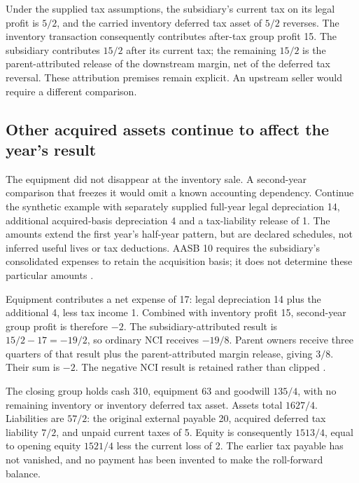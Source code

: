 Under the supplied tax assumptions, the subsidiary's current tax on its legal
profit is $5/2$, and the carried inventory deferred tax asset of $5/2$ reverses.
The inventory transaction consequently contributes after-tax group profit 15.
The subsidiary contributes $15/2$ after its current tax; the remaining $15/2$
is the parent-attributed release of the downstream margin, net of the deferred
tax reversal. These attribution premises remain explicit. An upstream seller
would require a different comparison.

\subsection{Other acquired assets continue to affect the year's result}

The equipment did not disappear at the inventory sale. A second-year comparison
that freezes it would omit a known accounting dependency. Continue the
synthetic example with separately supplied full-year legal depreciation 14,
additional acquired-basis depreciation 4 and a tax-liability release of 1.
The amounts extend the first year's half-year pattern, but are declared
schedules, not inferred useful lives or tax deductions. AASB 10 requires the
subsidiary's consolidated expenses to retain the acquisition basis; it does
not determine these particular amounts
\citep[para.~B88]{aasb10control2026}.

Equipment contributes a net expense of 17: legal depreciation 14 plus the
additional 4, less tax income 1. Combined with inventory profit 15, second-year
group profit is therefore $-2$. The subsidiary-attributed result is
$15/2-17=-19/2$, so ordinary NCI receives $-19/8$. Parent owners receive
three quarters of that result plus the parent-attributed margin release,
giving $3/8$. Their sum is $-2$. The negative NCI result is retained rather
than clipped \citep[para.~B94]{aasb10control2026}.

The closing group holds cash 310, equipment 63 and goodwill $135/4$, with no
remaining inventory or inventory deferred tax asset. Assets total $1627/4$.
Liabilities are $57/2$: the original external payable 20, acquired deferred
tax liability $7/2$, and unpaid current taxes of 5. Equity is consequently
$1513/4$, equal to opening equity $1521/4$ less the current loss of 2.
The earlier tax payable has not vanished, and no payment has been invented
to make the roll-forward balance.

